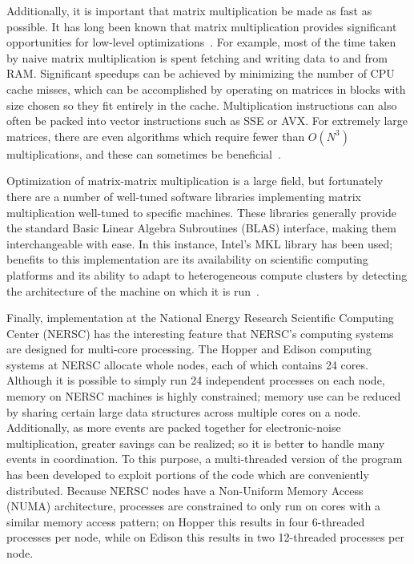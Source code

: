 Additionally, it is important that matrix multiplication be made as fast as possible.  It has long been known that matrix multiplication provides significant opportunities for low-level optimizations~\cite{AnatomyOfMatrixMultiply}. For example, most of the time taken by naive matrix multiplication is spent fetching and writing data to and from RAM.  Significant speedups can be achieved by minimizing the number of CPU cache misses, which can be accomplished by operating on matrices in blocks with size chosen so they fit entirely in the cache.  Multiplication instructions can also often be packed into vector instructions such as SSE or AVX.  For extremely large matrices, there are even algorithms which require fewer than $O(N^3)$ multiplications, and these can sometimes be beneficial~\cite{AnatomyOfMatrixMultiply}.

Optimization of matrix-matrix multiplication is a large field, but fortunately there are a number of well-tuned software libraries implementing matrix multiplication well-tuned to specific machines.  These libraries generally provide the standard Basic Linear Algebra Subroutines (BLAS) interface, making them interchangeable with ease.  In this instance, Intel's MKL library has been used; benefits to this implementation are its availability on scientific computing platforms and its ability to adapt to heterogeneous compute clusters by detecting the architecture of the machine on which it is run~\cite{IntelMKL}.

Finally, implementation at the National Energy Research Scientific Computing Center (NERSC) has the interesting feature that NERSC's computing systems are designed for multi-core processing.  The Hopper and Edison computing systems at NERSC allocate whole nodes, each of which contains 24 cores.  Although it is possible to simply run 24 independent processes on each node, memory on NERSC machines is highly constrained; memory use can be reduced by sharing certain large data structures across multiple cores on a node.  Additionally, as more events are packed together for electronic-noise multiplication, greater savings can be realized; so it is better to handle many events in coordination.  To this purpose, a multi-threaded version of the program has been developed to exploit portions of the code which are conveniently distributed.  Because NERSC nodes have a Non-Uniform Memory Access (NUMA) architecture, processes are constrained to only run on cores with a similar memory access pattern; on Hopper this results in four 6-threaded processes per node, while on Edison this results in two 12-threaded processes per node.


